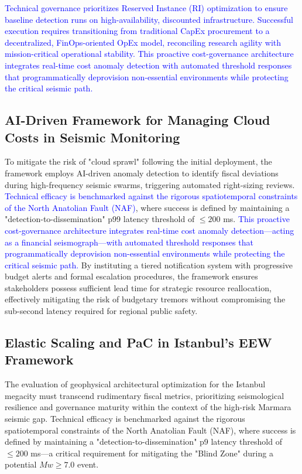 \documentclass[data,article,submit,pdftex,moreauthors]{Definitions/mdpi}
\begin{document}
\textcolor{blue}{Technical governance prioritizes Reserved Instance (RI) optimization to ensure baseline detection runs on high-availability, discounted infrastructure. Successful execution requires transitioning from traditional CapEx procurement to a decentralized, FinOps-oriented OpEx model, reconciling research agility with mission-critical operational stability. This proactive cost-governance architecture integrates real-time cost anomaly detection with automated threshold responses that programmatically deprovision non-essential environments while protecting the critical seismic path.}

\subsection{AI-Driven Framework for Managing Cloud Costs in Seismic Monitoring}
To mitigate the risk of "cloud sprawl" following the initial deployment, the framework employs AI-driven anomaly detection to identify fiscal deviations during high-frequency seismic swarms, triggering automated right-sizing reviews. \textcolor{blue}{Technical efficacy is benchmarked against the rigorous spatiotemporal constraints of the North Anatolian Fault (NAF)}, where success is defined by maintaining a "detection-to-dissemination" p99 latency threshold of $\leq 200$ ms. \textcolor{blue}{This proactive cost-governance architecture integrates real-time cost anomaly detection—acting as a financial seismograph—with automated threshold responses that programmatically deprovision non-essential environments while protecting the critical seismic path.} By instituting a tiered notification system with progressive budget alerts and formal escalation procedures, the framework ensures stakeholders possess sufficient lead time for strategic resource reallocation, effectively mitigating the risk of budgetary tremors without compromising the sub-second latency required for regional public safety.

\subsection{Elastic Scaling and PaC in Istanbul’s EEW Framework}
The evaluation of geophysical architectural optimization for the Istanbul megacity must transcend rudimentary fiscal metrics, prioritizing seismological resilience and governance maturity within the context of the high-risk Marmara seismic gap. Technical efficacy is benchmarked against the rigorous spatiotemporal constraints of the North Anatolian Fault (NAF), where success is defined by maintaining a "detection-to-dissemination" p9 latency threshold of $\leq 200$ ms—a critical requirement for mitigating the "Blind Zone" during a potential $Mw \geq 7.0$ event.
\end{document}
